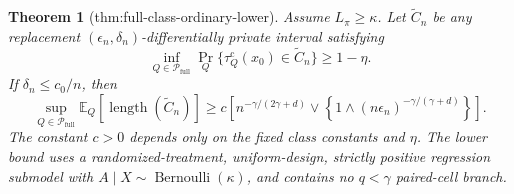 \documentclass{article}
\newtheorem{theorem}{Theorem}
\begin{document}
\begin{theorem}[thm:full-class-ordinary-lower]\label{thm:full-class-ordinary-lower}
Assume \(L_\pi\ge\kappa\).  Let \(\widetilde C_n\) be any replacement \((\epsilon_n,\delta_n)\)-differentially private interval satisfying
\[
 \inf_{Q\in\mathcal P_{\mathrm{full}}}
 \Pr_Q\{\tau_Q^{\mathrm c}(x_0)\in\widetilde C_n\}\ge1-\eta.
\]
If \(\delta_n\le c_0/n\), then
\[
 \sup_{Q\in\mathcal P_{\mathrm{full}}}
 \mathbb E_Q[\operatorname{length}(\widetilde C_n)]
 \ge c\left[n^{-\gamma/(2\gamma+d)}
 \vee\left\{1\wedge(n\epsilon_n)^{-\gamma/(\gamma+d)}\right\}\right].
\]
The constant \(c>0\) depends only on the fixed class constants and \(\eta\).  The lower bound uses a randomized-treatment, uniform-design, strictly positive regression submodel with \(A\mid X\sim\operatorname{Bernoulli}(\kappa)\), and contains no \(q<\gamma\) paired-cell branch.
\end{theorem}
\end{document}
